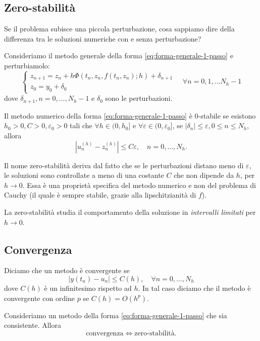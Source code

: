 \subsection{Zero-stabilità}
Se il problema subisce una piccola perturbazione, cosa sappiamo dire della differenza tra le soluzioni numeriche con e senza perturbazione?

Consideriamo il metodo generale della forma \eqref{eq:forma-generale-1-passo} e perturbiamolo:
\begin{equation*}
\begin{cases}
z_{n+1} =z_{n} +h\Phi ( t_{n} ,z_{n} ,f( t_{n} ,z_{n}) ;h) +\delta _{n+1}\\
z_{0} =y_{0} + \delta _{0}
\end{cases} \quad \forall n=0,1,\dotsc N_{h} -1
\end{equation*}
dove $\delta _{n+1} ,n=0,\dotsc ,N_{h} -1$ e $\delta _{0}$ sono le perturbazioni.
\begin{definition}
Il metodo numerico della forma \eqref{eq:forma-generale-1-passo} è $0$-stabile se esistono $h_{0}  >0, C >0, \varepsilon _{0}  >0$ tali che $\forall h\in ( 0,h_{0}]$ e $\forall \varepsilon \in ( 0,\varepsilon _{0}]$, se $| \delta _{n}| \leqslant \varepsilon ,0\leqslant n\leqslant N_{h}$, allora
\begin{equation*}
\left| u^{(h)}_{n} -z^{(h)}_{n}\right| \leqslant C\varepsilon ,\quad n=0,\dotsc ,N_{h}.
\end{equation*}
\end{definition}

Il nome zero-stabilità deriva dal fatto che se le perturbazioni distano meno di $\varepsilon $, le soluzioni sono controllate a meno di una costante $C$ che non dipende da $h$, per $h\rightarrow 0$.
Essa è una proprietà specifica del metodo numerico e non del problema di Cauchy (il quale è sempre stabile, grazie alla lipschitzianità di $f$).

La zero-stabilità studia il comportamento della soluzione in \textit{intervalli limitati} per $h\rightarrow 0$.
\subsection{Convergenza}
\begin{definition}
[Convergenza]
Diciamo che un metodo è convergente se
\begin{equation*}
| y( t_{n}) -u_{n}| \leqslant C(h) ,\quad \forall n=0,\dotsc ,N_{h}
\end{equation*}
dove $C(h)$ è un infinitesimo rispetto ad $h$. In tal caso diciamo che il metodo è convergente con ordine $p$ se $C(h) =O\left( h^{p}\right)$.
\end{definition}
\begin{theorem}
Consideriamo un metodo della forma \eqref{eq:forma-generale-1-passo} che sia consistente. Allora
\begin{equation*}
\text{convergenza} \Leftrightarrow \text{zero-stabilità}.
\end{equation*}
\end{theorem}

